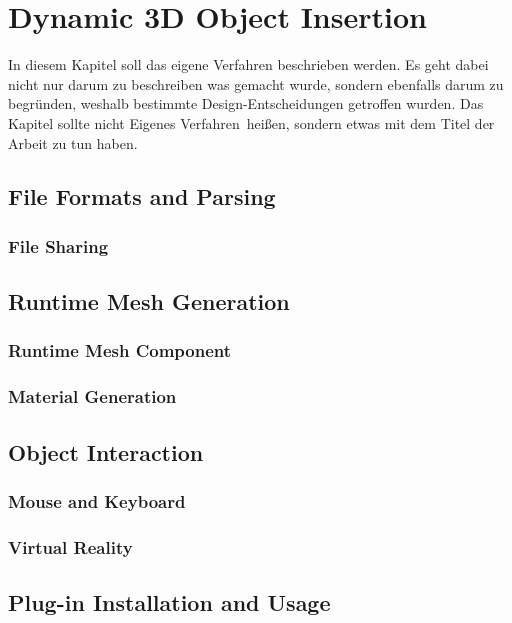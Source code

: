 \chapter{Dynamic 3D Object Insertion}
In diesem Kapitel soll das eigene Verfahren beschrieben werden. Es geht dabei nicht nur darum zu beschreiben was gemacht wurde, sondern ebenfalls darum zu begründen, weshalb bestimmte Design-Entscheidungen getroffen wurden. Das Kapitel sollte nicht \glqq Eigenes Verfahren\grqq \ heißen, sondern etwas mit dem Titel der Arbeit zu tun haben.

\section{File Formats and Parsing}


\subsection{File Sharing}

\section{Runtime Mesh Generation}
\subsection{Runtime Mesh Component}
\subsection{Material Generation}
\section{Object Interaction}

\subsection{Mouse and Keyboard}

\subsection{Virtual Reality}

\section{Plug-in Installation and Usage}



